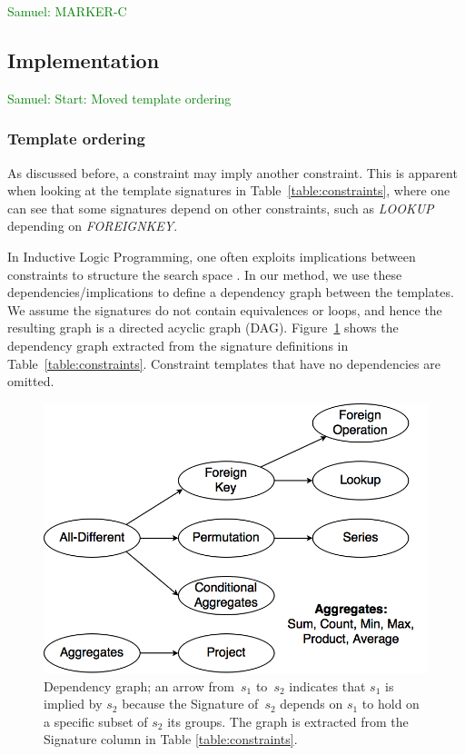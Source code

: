 \documentclass{IEEEtran}
\newcommand{\samuel}[1]{\textcolor{green}{{\sc Samuel:} #1}\xspace}
\newcommand{\CSignature}{Signature\xspace}
\theoremstyle{definition}
\begin{document}
\samuel{MARKER-C}
\subsection{Implementation}

\samuel{Start: Moved template ordering}
\subsubsection{Template ordering}
As discussed before, a constraint may imply another constraint. This is apparent when looking at the template signatures in Table~\ref{table:constraints}, where one can see that some signatures depend on other constraints, such as \textit{LOOKUP} depending on \textit{FOREIGNKEY}.

In Inductive Logic Programming, one often exploits implications between constraints to structure the search space \cite{luc_book}.
In our method, we use these dependencies/implications to define a dependency graph between the templates. We assume the signatures do not contain equivalences or loops, and hence the resulting graph is a directed acyclic graph (DAG).
Figure~\ref{fig:learning_order} shows the dependency graph extracted from the signature definitions in Table~\ref{table:constraints}. 
Constraint templates that have no dependencies are omitted. 

\begin{figure}[t]
  \centering
  \includegraphics[width=0.8\linewidth]{figures/constraint_dependency.png}
  \caption{Dependency graph; an arrow from~$s_1$ to~$s_2$ indicates that $s_1$ is implied by $s_2$ because the \CSignature of~$s_2$ depends on $s_1$ to hold on a specific subset of $s_2$ its groups.
    The graph is extracted from the Signature column in Table \ref{table:constraints}.
  }
  \label{fig:learning_order}
\end{figure}
\end{document}
